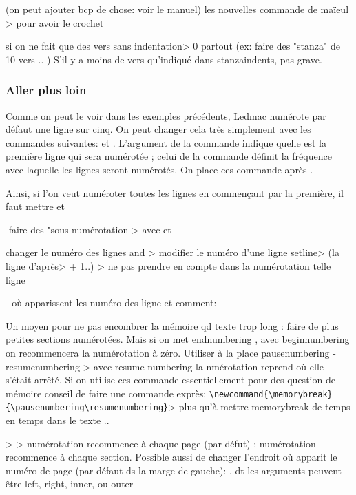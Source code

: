 (on peut ajouter bcp de chose: voir le manuel)
les nouvelles commande de maïeul > pour avoir le crochet

si on ne fait que des vers sans indentation> 0 partout (ex: faire des "stanza" de 10 vers .. ) S'il y a moins de vers qu'indiqué dans stanzaindents, pas grave.

\subsubsection{Aller plus loin}

Comme on peut le voir dans les exemples précédents, Ledmac numérote par défaut  une ligne sur cinq. On peut changer cela très simplement avec les commandes suivantes:
 et .
L'argument  de la commande  indique quelle est  la première ligne qui sera numérotée ; celui de la commande  définit la fréquence avec laquelle les lignes seront numérotés. On place ces commande après . 

Ainsi, si l'on veut numéroter toutes les lignes en commençant par la première, il faut mettre  et  


\bigbreak

-faire des "sous-numérotation
> avec  
et 

changer le numéro des lignes
 and  > modifier le numéro d'une ligne 
setline> (la ligne d'après> + 1..)
 > ne pas prendre en compte dans la numérotation telle ligne

- où apparissent les numéro des ligne et comment: %


Un moyen pour ne pas encombrer la mémoire qd texte trop long : faire de plus petites sections numérotées. Mais si on met endnumbering ,  avec beginnumbering on recommencera la numérotation à zéro.  Utiliser à la place pausenumbering - resumenumbering > avec resume numbering la nmérotation reprend où elle s'était arrêté. Si on utilise ces commande essentiellement pour des question de mémoire conseil de faire une commande exprès: \verb|\newcommand{\memorybreak}{\pausenumbering\resumenumbering}|> plus qu'à mettre memorybreak de temps en temps dans le texte ..

 >  > numérotation recommence à chaque page  (par défut) : numérotation recommence à chaque section.
Possible aussi de changer l'endroit où apparit le numéro de page (par défaut ds la marge de gauche): , dt les arguments peuvent être left, right, inner, ou outer

